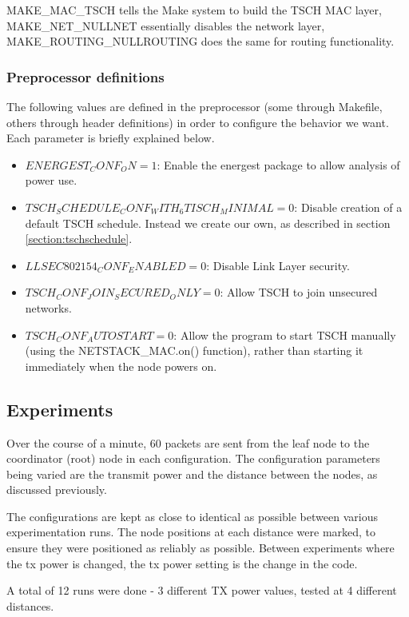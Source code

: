 \documentclass[conference]{IEEEtran}
\begin{document}
MAKE_MAC_TSCH tells the Make system to build the TSCH MAC layer, MAKE_NET_NULLNET essentially disables the network layer, MAKE_ROUTING_NULLROUTING does the same for routing functionality. 

\subsubsection{Preprocessor definitions}

The following values are defined in the preprocessor (some through Makefile, others through header definitions) in order to configure the behavior we want. Each parameter is briefly explained below.

\label{section:preprocessdef}
\begin{itemize}
\item $ENERGEST_CONF_ON=1$: Enable the energest package to allow analysis of power use. 
\item $TSCH_SCHEDULE_CONF_WITH_6TISCH_MINIMAL=0$: Disable creation of a default TSCH schedule. Instead we create our own, as described in section \ref{section:tschschedule}.
\item $LLSEC802154_CONF_ENABLED=0$: Disable Link Layer security.
\item $TSCH_CONF_JOIN_SECURED_ONLY=0$: Allow TSCH to join unsecured networks.
\item $TSCH_CONF_AUTOSTART=0$: Allow the program to start TSCH manually (using the NETSTACK_MAC.on() function), rather than starting it immediately when the node powers on.
\end{itemize}


\subsection{Experiments}

Over the course of a minute, 60 packets are sent from the leaf node to the coordinator (root) node in each configuration. The configuration parameters being varied are the transmit power and the distance between the nodes, as discussed previously. 

The configurations are kept as close to identical as possible between various experimentation runs. The node positions at each distance were marked, to ensure they were positioned as reliably as possible. Between experiments where the tx power is changed, the tx power setting is the change in the code. 

A total of 12 runs were done - 3 different TX power values, tested at 4 different distances. 
\end{document}
